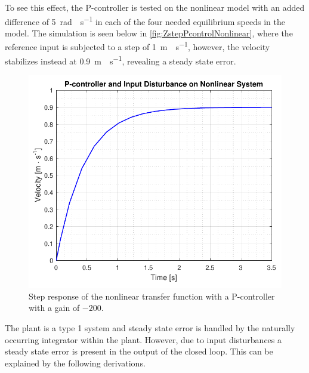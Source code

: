 To see this effect, the P-controller is tested on the nonlinear model with an added difference of \SI{5}{rad \cdot s^{-1}} in each of the four needed equilibrium speeds in the model. The simulation is seen below in \autoref{fig:ZstepPcontrolNonlinear}, where the reference input is subjected to a step of \SI{1}{m \cdot s^{-1}}, however, the velocity stabilizes instead at \SI{0.9}{m \cdot s^{-1}}, revealing a steady state error.

\begin{figure}[H]
	\centering
	\includegraphics[width=.6\textwidth]{figures/ZstepPcontrolNonlinear.pdf}
	\caption{Step response of the nonlinear transfer function with a P-controller with a gain of $-200$.}
	\label{fig:ZstepPcontrolNonlinear}
\end{figure}
%

The plant is a type 1 system and steady state error is handled by the naturally occurring integrator within the plant. However, due to input disturbances a steady state error is present in the output of the closed loop. This can be explained by the following derivations.   

